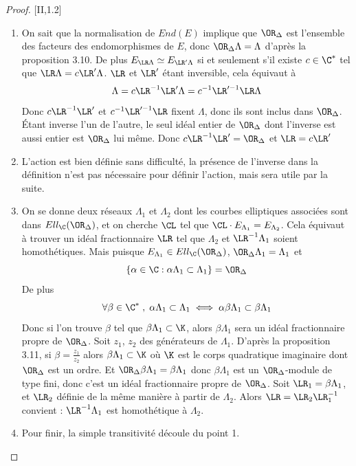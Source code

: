 \begin{proof}\cite{Sil94}[II,1.2]
	
	\begin{enumerate}
		\item On sait que la normalisation de $End(E)$ implique que $\OR_{\Delta}$ est l'ensemble des facteurs des endomorphismes de $E$, donc $\OR_{\Delta}\Lambda = \Lambda$ d'après la proposition 3.10. De plus $E_{\LR\Lambda} \simeq E_{\LR'\Lambda}$ si et seulement s'il existe $c\in\C^{*}$ tel que $\LR\Lambda = c\LR'\Lambda$. $\LR$ et $\LR'$ étant inversible, cela équivaut à 
		\begin{equation*}
			\Lambda = c\LR^{-1}\LR'\Lambda = c^{-1}\LR'^{-1}\LR\Lambda
		\end{equation*}
		Donc $c\LR^{-1}\LR'$ et $c^{-1}\LR'^{-1}\LR$ fixent $\Lambda$, donc ils sont inclus dans $\OR_{\Delta}$. Étant inverse l'un de l'autre, le seul idéal entier de $\OR_{\Delta}$ dont l'inverse est aussi entier est $\OR_{\Delta}$ lui même. Donc $c\LR^{-1}\LR' = \OR_{\Delta}$ et $\LR = c\LR'$
		
		\item L'action est bien définie sans difficulté, la présence de l'inverse dans la définition n'est pas nécessaire pour définir l'action, mais sera utile par la suite. 
		
		\item On se donne deux réseaux $\Lambda_1$ et $\Lambda_2$ dont les courbes elliptiques associées sont dans $Ell_{\C}(\OR_{\Delta})$, et on cherche $\CL$ tel que $\CL\cdot E_{\Lambda_1} = E_{\Lambda_2}$. Cela équivaut à trouver un idéal fractionnaire $\LR$ tel que $\Lambda_2$ et $\LR^{-1}\Lambda_1$ soient homothétiques. Mais puisque $E_{\Lambda_1}\in Ell_{\C}(\OR_{\Delta})$, $\OR_{\Delta}\Lambda_1 = \Lambda_1$ et 
		\begin{equation*}
			\left\lbrace \alpha\in\C : \alpha\Lambda_1\subset\Lambda_1\right\rbrace = \OR_{\Delta}
		\end{equation*}
		De plus 
		\begin{equation*}
			\forall \beta\in\C^{*}\;,\; \alpha\Lambda_1\subset\Lambda_1\iff\alpha\beta\Lambda_1\subset\beta\Lambda_1
		\end{equation*}
		Donc si l'on trouve $\beta$ tel que $\beta\Lambda_1\subset\K$, alors $\beta\Lambda_1$ sera un idéal fractionnaire propre de $\OR_{\Delta}$. Soit $z_1$, $z_2$ des générateurs de $\Lambda_1$. D'après la proposition 3.11, si $\beta = \frac{z_1}{z_2}$ alors $\beta\Lambda_1\subset\K$ où $\K$ est le corps quadratique imaginaire dont $\OR_{\Delta}$ est un ordre. Et $\OR_{\Delta}\beta\Lambda_1 = \beta\Lambda_1$ donc $\beta\Lambda_1$ est un $\OR_{\Delta}$-module de type fini, donc c'est un idéal fractionnaire propre de $\OR_{\Delta}$. Soit $\LR_1 = \beta\Lambda_1$, et $\LR_2$ définie de la même manière à partir de $\Lambda_2$. Alors $\LR = \LR_2\LR_1^{-1}$ convient : $\LR^{-1}\Lambda_1$ est homothétique à $\Lambda_2$.
		
		\item Pour finir, la simple transitivité découle du point 1.
		
	\end{enumerate}
	
\end{proof}

